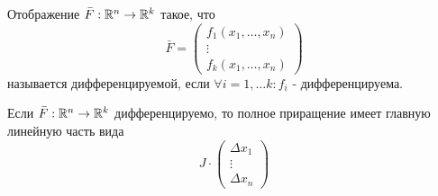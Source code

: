 \begin{definition}
    Отображение $\bar{F}:\mathbb{R}^n\to \mathbb{R}^k$ такое, что
    \[\bar{F}=\begin{pmatrix}
        f_1(x_1,\dots,x_n)\\
        \vdots\\
        f_k(x_1,\dots,x_n)
    \end{pmatrix}
    \]
    называется дифференцируемой, если $\forall i=1,\dots k: f_i$ - дифференцируема. 
\end{definition} 
\begin{statement}
    Если $\bar{F}: \mathbb{R}^n\to \mathbb{R}^k$ дифференцируемо, то полное приращение имеет главную линейную часть вида
    \[J\cdot \begin{pmatrix}
        \Delta x_1\\
        \vdots\\
        \Delta x_n
    \end{pmatrix}\]
\end{statement} 
